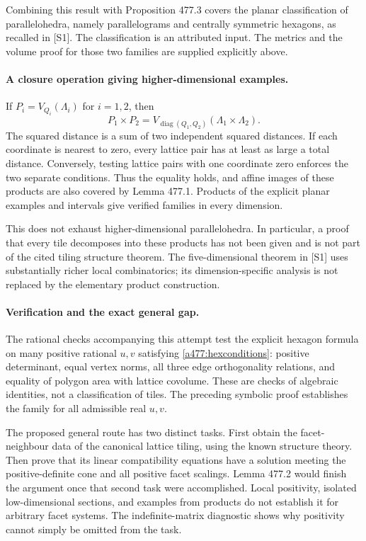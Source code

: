 \documentclass[11pt]{article}
\begin{document}
Combining this result with Proposition 477.3 covers the planar
classification of parallelohedra, namely parallelograms and centrally
symmetric hexagons, as recalled in [S1]. The classification is an
attributed input. The metrics and the volume proof for those two
families are supplied explicitly above.

\paragraph{A closure operation giving higher-dimensional examples.}
If $P_i=V_{Q_i}(\Lambda_i)$ for $i=1,2$, then
\begin{equation}\label{a477:product}
 P_1\times P_2
    =V_{\operatorname{diag}(Q_1,Q_2)}(\Lambda_1\times\Lambda_2).
\end{equation}
The squared distance is a sum of two independent squared distances.
If each coordinate is nearest to zero, every lattice pair has at least
as large a total distance. Conversely, testing lattice pairs with one
coordinate zero enforces the two separate conditions. Thus the equality
holds, and affine images of these products are also covered by
Lemma 477.1. Products of the explicit planar examples and intervals
give verified families in every dimension.

This does not exhaust higher-dimensional parallelohedra. In particular,
a proof that every tile decomposes into these products has not been
given and is not part of the cited tiling structure theorem. The
five-dimensional theorem in [S1] uses substantially richer local
combinatorics; its dimension-specific analysis is not replaced by
the elementary product construction.

\paragraph{Verification and the exact general gap.}
The rational checks accompanying this attempt test the explicit hexagon
formula on many positive rational $u,v$ satisfying
\eqref{a477:hexconditions}: positive determinant, equal vertex norms,
all three edge orthogonality relations, and equality of polygon area
with lattice covolume. These are checks of algebraic identities, not
a classification of tiles. The preceding symbolic proof establishes
the family for all admissible real $u,v$.

The proposed general route has two distinct tasks. First obtain the
facet-neighbour data of the canonical lattice tiling, using the known
structure theory. Then prove that its linear compatibility equations
have a solution meeting the positive-definite cone and all positive
facet scalings. Lemma 477.2 would finish the argument once that second
task were accomplished. Local positivity, isolated low-dimensional
sections, and examples from products do not establish it for arbitrary
facet systems. The indefinite-matrix diagnostic shows why positivity
cannot simply be omitted from the task.
\end{document}

